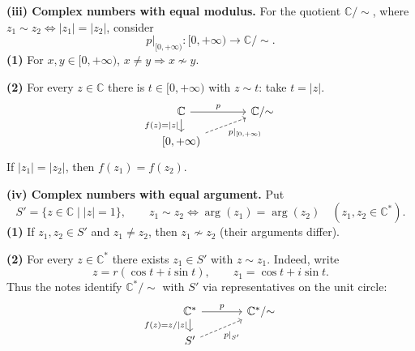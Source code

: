 \medskip
\noindent\textbf{(iii) Complex numbers with equal modulus.}
For the quotient $\mathbb C/{\sim}$, where
$z_1\sim z_2\iff|z_1|=|z_2|$, consider
\[
 p|_{[0,+\infty)}:[0,+\infty)\longrightarrow\mathbb C/{\sim}.
\]
\noindent\textbf{(1)} For $x,y\in[0,+\infty)$,
$x\ne y\Longrightarrow x\not\sim y$.

\noindent\textbf{(2)} For every $z\in\mathbb C$ there is
$t\in[0,+\infty)$ with $z\sim t$: take $t=|z|$.
\[
\begin{tikzcd}[column sep=large,row sep=small]
 \mathbb C\arrow[r,"p"]\arrow[d,"{f(z)=|z|}"']
    & \mathbb C/{\sim} \\
 {[0,+\infty)}\arrow[ur,dashed,"{p|_{[0,+\infty)}}"'] &
\end{tikzcd}
\]
If $|z_1|=|z_2|$, then $f(z_1)=f(z_2)$.

\medskip
\noindent\textbf{(iv) Complex numbers with equal argument.}
Put
\[
 S'=\{z\in\mathbb C\mid |z|=1\},\qquad
 z_1\sim z_2\iff\arg(z_1)=\arg(z_2)
 \quad(z_1,z_2\in\mathbb C^*).
\]
\noindent\textbf{(1)} If $z_1,z_2\in S'$ and $z_1\ne z_2$,
then $z_1\not\sim z_2$ (their arguments differ).

\noindent\textbf{(2)} For every $z\in\mathbb C^*$ there exists
$z_1\in S'$ with $z\sim z_1$. Indeed, write
\[
 z=r(\cos t+i\sin t),\qquad z_1=\cos t+i\sin t.
\]
Thus the notes identify $\mathbb C^*/{\sim}$ with $S'$ via
representatives on the unit circle:
\[
\begin{tikzcd}[column sep=large,row sep=small]
 \mathbb C^*\arrow[r,"p"]\arrow[d,"{f(z)=z/|z|}"']
    & \mathbb C^*/{\sim} \\
 S'\arrow[ur,dashed,"{p|_{S'}}"'] &
\end{tikzcd}
\]

\endgroup
